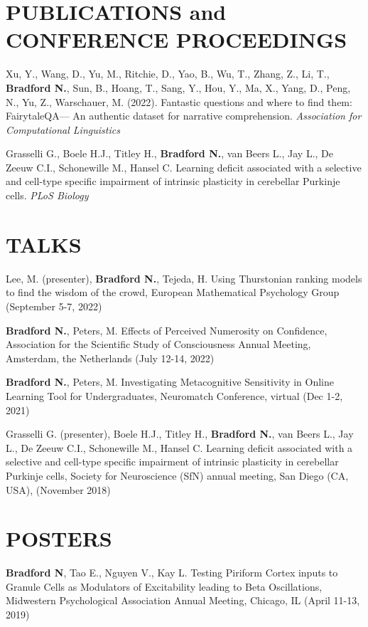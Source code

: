 \documentclass[margin, 10pt]{res} %
\begin{document}
\begin{resume}
\section{PUBLICATIONS and CONFERENCE PROCEEDINGS}
Xu, Y., Wang, D., Yu, M., Ritchie, D., Yao, B., Wu, T., Zhang, Z., Li, T., \textbf{Bradford N.}, Sun, B., Hoang, T., Sang, Y., Hou, Y., Ma, X., Yang, D., Peng, N., Yu, Z., Warschauer, M. (2022). Fantastic questions and where to find them: FairytaleQA— An authentic dataset for narrative comprehension. {\sl Association for Computational Linguistics}

Grasselli G., Boele H.J., Titley H., \textbf{Bradford N.}, van Beers L., Jay L., De Zeeuw C.I., Schonewille M., Hansel C. Learning deficit associated with a selective and cell-type specific impairment of intrinsic plasticity in cerebellar Purkinje cells.  {\sl PLoS Biology}

\section{TALKS}
Lee, M. (presenter), \textbf{Bradford N.}, Tejeda, H. Using Thurstonian ranking models to find the wisdom of the crowd, European Mathematical Psychology Group (September 5-7, 2022)

\textbf{Bradford N.}, Peters, M. Effects of Perceived Numerosity on Confidence, Association for the Scientific Study of Consciousness Annual Meeting, Amsterdam, the Netherlands (July 12-14, 2022)

\textbf{Bradford N.}, Peters, M. Investigating Metacognitive Sensitivity in Online Learning Tool for Undergraduates, Neuromatch Conference, virtual (Dec 1-2, 2021)

Grasselli G. (presenter), Boele H.J., Titley H., \textbf{Bradford N.}, van Beers L., Jay L., De Zeeuw C.I., Schonewille M., Hansel C. Learning deficit associated with a selective and cell-type specific impairment of intrinsic plasticity in cerebellar Purkinje cells, Society for Neuroscience (SfN) annual meeting, San Diego (CA, USA), (November 2018)

\section{POSTERS}

\textbf{Bradford N}, Tao E., Nguyen V., Kay L. Testing Piriform Cortex inputs to Granule Cells as Modulators of Excitability leading to Beta Oscillations, Midwestern Psychological Association Annual Meeting, Chicago, IL (April 11-13, 2019)


\end{resume}
\end{document}
